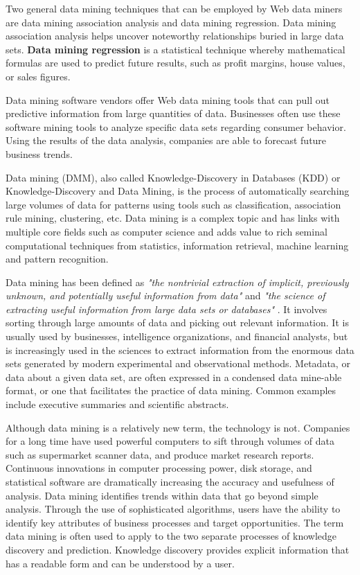 \documentclass[11pt]{article} %
\begin{document}
Two general data mining techniques that can be employed by Web data miners are data mining association analysis and data mining regression. Data mining association analysis helps uncover noteworthy relationships buried in large data sets. \textbf{Data mining regression} is a statistical technique whereby mathematical formulas are used to predict future results, such as profit margins, house values, or sales figures.

Data mining software vendors offer Web data mining tools that can pull out predictive information from large quantities of data. Businesses often use these software mining tools to analyze specific data sets regarding consumer behavior. Using the results of the data analysis, companies are able to forecast future business trends.



Data mining (DMM), also called Knowledge-Discovery in Databases (KDD) or Knowledge-Discovery and Data Mining, is the process of automatically searching large volumes of data for patterns using tools such as classification, association rule mining, clustering, etc. Data mining is a complex topic and has links with multiple core fields such as computer science and adds value to rich seminal computational techniques from statistics, information retrieval, machine learning and pattern recognition.




Data mining has been defined as \emph{"the nontrivial extraction of implicit, previously unknown, and potentially useful information from data"} and \emph{"the science of extracting useful information from large data sets or databases" }. It involves sorting through large amounts of data and picking out relevant information. It is usually used by businesses, intelligence organizations, and financial analysts, but is increasingly used in the sciences to extract information from the enormous data sets generated by modern experimental and observational methods. Metadata, or data about a given data set, are often expressed in a condensed data mine-able format, or one that facilitates the practice of data mining. Common examples include executive summaries and scientific abstracts.




Although data mining is a relatively new term, the technology is not. Companies for a long time have used powerful computers to sift through volumes of data such as supermarket scanner data, and produce market research reports. Continuous innovations in computer processing power, disk storage, and statistical software are dramatically increasing the accuracy and usefulness of analysis. Data mining identifies trends within data that go beyond simple analysis. Through the use of sophisticated algorithms, users have the ability to identify key attributes of business processes and target opportunities. The term data mining is often used to apply to the two separate processes of knowledge discovery and prediction. Knowledge discovery provides explicit information that has a readable form and can be understood by a user.
\end{document}

